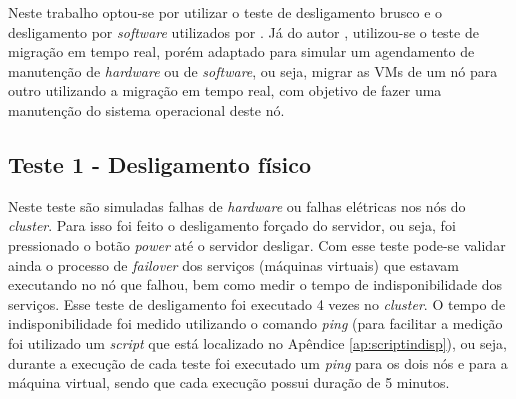 Neste trabalho optou-se por utilizar o teste de desligamento brusco e o desligamento por \textit{software} utilizados por \citet{reis2009}.
Já do autor \citet{goncalves2009}, utilizou-se o teste de migração em tempo real, porém adaptado para simular um agendamento de manutenção de 
\textit{hardware} ou de \textit{software}, ou seja, migrar as \acp{VM} de um nó para outro utilizando a migração em tempo real, 
com objetivo de fazer uma manutenção do sistema operacional deste nó.


\subsection{Teste 1 - Desligamento físico}

Neste teste são simuladas falhas de \textit{hardware} ou falhas elétricas nos nós do \textit{cluster}. Para isso foi feito o desligamento 
forçado do servidor, ou seja, foi pressionado o botão \textit{power} até o servidor desligar.
Com esse teste pode-se validar ainda o processo de \textit{failover} dos serviços (máquinas virtuais) que estavam executando no nó que falhou, 
bem como medir o tempo de indisponibilidade dos serviços. 
Esse teste de desligamento foi executado 4 vezes no \textit{cluster}. O tempo de indisponibilidade foi medido utilizando o comando \textit{ping}
(para facilitar a medição foi utilizado um \textit{script} que está localizado no Apêndice \ref{ap:scriptindisp}), ou seja, durante a execução de 
cada teste foi executado um \textit{ping} para os dois nós e para a máquina virtual, sendo que cada execução possui duração de 5 minutos.

